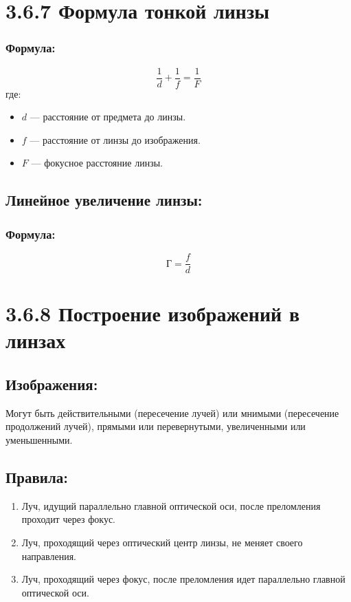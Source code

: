 \documentclass[a4paper,12pt]{article}
\begin{document}
\section*{3.6.7 Формула тонкой линзы}
\vspace{-9pt}
\subsubsection*{Формула:}
\vspace{-0.05em}
$$ \frac{1}{d} + \frac{1}{f} = \frac{1}{F} $$
где:
\begin{itemize}
    \item $d$ — расстояние от предмета до линзы.
    \item $f$ — расстояние от линзы до изображения.
    \item $F$ — фокусное расстояние линзы.
\end{itemize}

\vspace{-9pt}
\subsection*{Линейное увеличение линзы:}
\vspace{-3pt}
\subsubsection*{Формула:}
\vspace{-0.05em}
$$ Г = \frac{f}{d} $$

\section*{3.6.8 Построение изображений в линзах}
\vspace{-9pt}
\subsection*{Изображения:}
\vspace{-3pt}
Могут быть действительными (пересечение лучей) или мнимыми (пересечение продолжений лучей), прямыми или перевернутыми, увеличенными или уменьшенными.

\vspace{-9pt}
\subsection*{Правила:}
\vspace{-3pt}
\begin{enumerate}[itemsep=0pt, topsep=0pt, parsep=3pt]
    \item Луч, идущий параллельно главной оптической оси, после преломления проходит через фокус.
    \item Луч, проходящий через оптический центр линзы, не меняет своего направления.
    \item Луч, проходящий через фокус, после преломления идет параллельно главной оптической оси.
\end{enumerate}
\end{document}
